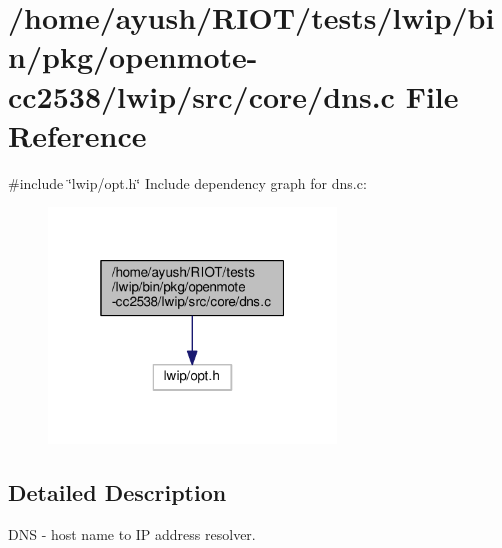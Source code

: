 \hypertarget{openmote-cc2538_2lwip_2src_2core_2dns_8c}{}\section{/home/ayush/\+R\+I\+O\+T/tests/lwip/bin/pkg/openmote-\/cc2538/lwip/src/core/dns.c File Reference}
\label{openmote-cc2538_2lwip_2src_2core_2dns_8c}
{\ttfamily \#include \char`\"{}lwip/opt.\+h\char`\"{}}\newline
Include dependency graph for dns.\+c\+:
\nopagebreak
\begin{figure}[H]
\begin{center}
\leavevmode
\includegraphics[width=217pt]{openmote-cc2538_2lwip_2src_2core_2dns_8c__incl}
\end{center}
\end{figure}


\subsection{Detailed Description}
D\+NS -\/ host name to IP address resolver. 